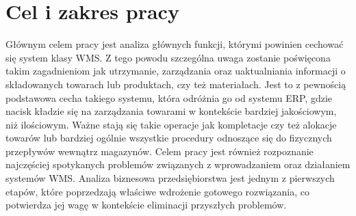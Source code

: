 \section{Cel i zakres pracy}
	Głównym celem pracy jest analiza głównych funkcji, którymi powinien cechować
	się system klasy WMS. Z tego powodu szczególna uwaga zostanie poświęcona takim
	zagadnieniom jak utrzymanie, zarządzania oraz uaktualniania informacji o 
	składowanych towarach lub produktach, czy też materiałach. Jest to z pewnością
	podstawowa cecha takiego systemu, która odróżnia go od systemu ERP, gdzie nacisk
	kładzie się na zarządzania towarami w kontekście bardziej jakościowym, niż
	ilościowym. Ważne stają się takie operacje jak kompletacje czy też alokacje towarów
	lub bardziej ogólnie wszystkie procedury odnoszące się do fizycznych przepływów
	wewnątrz magazynów. 
	Celem pracy jest również rozpoznanie najczęściej spotykanych problemów związanych
	z wprowadzaniem oraz działaniem systemów WMS. Analiza biznesowa przedsiębiorstwa
	jest jednym z pierwszych etapów, które poprzedzają właściwe wdrożenie
	gotowego rozwiązania, co potwierdza jej wagę w kontekście eliminacji przyszłych
	problemów.
	
